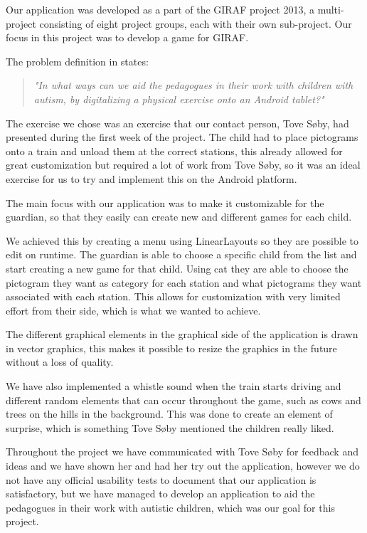 Our application was developed as a part of the GIRAF project 2013, a multi-project consisting of eight project groups, each with their own sub-project. Our focus in this project was to develop a game for GIRAF. 

The problem definition in  states:

\begin{quote}
\textit{"In what ways can we aid the pedagogues in their work with children with autism, by digitalizing a physical exercise onto an Android tablet?"} 
\end{quote}
The exercise we chose was an exercise that our contact person, Tove Søby, had presented during the first week of the project. The child had to place pictograms onto a train and unload them at the correct stations, this already allowed for great customization but required a lot of work from Tove Søby, so it was an ideal exercise for us to try and implement this on the Android platform. 

The main focus with our application was to make it customizable for the guardian, so that they easily can create new and different games for each child. 

We achieved this by creating a menu using LinearLayouts so they are possible to edit on runtime. The guardian is able to choose a specific child from the list and start creating a new game for that child. Using \ac{cat} they are able to choose the pictogram they want as category for each station and what pictograms they want associated with each station. This allows for customization with very limited effort from their side, which is what we wanted to achieve. 

The different graphical elements in the graphical side of the application is drawn in vector graphics, this makes it possible to resize the graphics in the future without a loss of quality. 

We have also implemented a whistle sound when the train starts driving and different random elements that can occur throughout the game, such as cows and trees on the hills in the background. This was done to create an element of surprise, which is something Tove Søby mentioned the children really liked.

Throughout the project we have communicated with Tove Søby for feedback and ideas and we have shown her and had her try out the application, however we do not have any official usability tests to document that our application is satisfactory, but we have managed to develop an application to aid the pedagogues in their work with autistic children, which was our goal for this project. 
